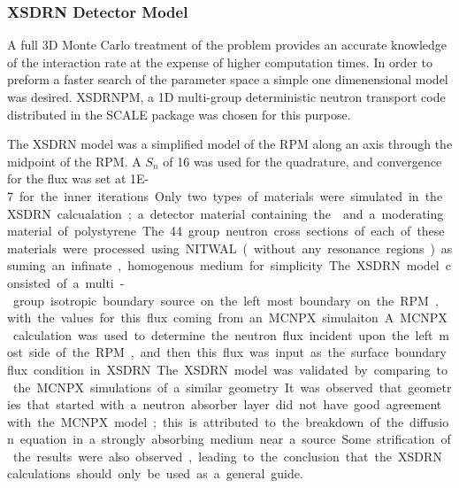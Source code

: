 \subsubsection{XSDRN Detector Model}
A full 3D Monte Carlo treatment of the problem provides an accurate knowledge of the interaction rate at the expense of higher computation times. 
In order to preform a faster search of the parameter space a simple one dimenensional model was desired.
XSDRNPM, a 1D multi-group deterministic neutron transport code distributed in the SCALE package was chosen for this purpose.

The XSDRN model was a simplified model of the RPM along an axis through the midpoint of the RPM.
A $S_n$ of 16 was used for the quadrature, and convergence for the flux was set at \SI{1E-7} for the inner iterations.
Only two types of materials were simulated in the XSDRN calcualation; a detector material containing the  and a moderating material of polystyrene.
The 44 group neutron cross sections of each of these materials were processed using NITWAL (without any resonance regions) assuming an infinate, homogenous medium for simplicity.
The XSDRN model consisted of a multi-group isotropic boundary source on the left most boundary on the RPM, with the values for this flux coming from an MCNPX simulaiton.
A MCNPX calculation was used to determine the neutron flux incident upon the left most side of the RPM, and then this flux was input as the surface boundary flux condition in XSDRN.

The XSDRN model was validated by comparing to the MCNPX simulations of a similar geometry.
It was observed that geometries that started with a neutron absorber layer did not have good agreement with the MCNPX model; this is attributed to the breakdown of the diffusion equation in a strongly absorbing medium near a source.

Some strification of the results were also observed, leading to the conclusion that the XSDRN calculations should only be used as a general guide.
